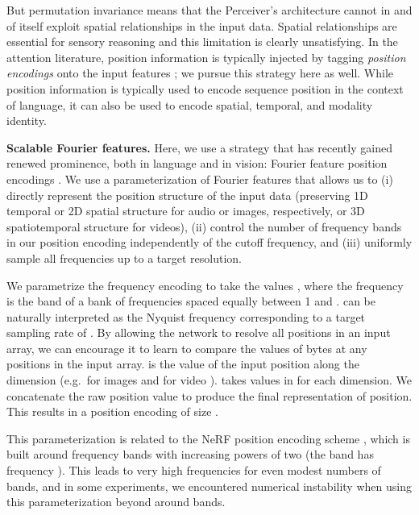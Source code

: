 \documentclass{article}
\begin{document}
But permutation invariance means that the Perceiver's architecture cannot in and of itself exploit spatial relationships in the input data. Spatial relationships are essential for sensory reasoning \cite{kant1781critique} and this limitation is clearly unsatisfying. In the attention literature, position information is typically injected by tagging \textit{position encodings} onto the input features \cite{vaswani2017attention}; we pursue this strategy here as well. While position information is typically used to encode sequence position in the context of language, it can also be used to encode spatial, temporal, and modality identity.

\noindent \textbf{Scalable Fourier features.} Here, we use a strategy that has recently gained renewed prominence, both in language and in vision: Fourier feature position encodings \cite{stanley2007compositional, vaswani2017attention, parmar2018image, tancik2020fourier, mildenhall2020nerf}. We use a parameterization of Fourier features that allows us to (i) directly represent the position structure of the input data (preserving 1D temporal or 2D spatial structure for audio or images, respectively, or 3D spatiotemporal structure for videos), (ii) control the number of frequency bands in our position encoding independently of the cutoff frequency, and (iii) uniformly sample all frequencies up to a target resolution. 

We parametrize the frequency encoding to take the values , where the frequency  is the  band of a bank of frequencies spaced equally between 1 and .  can be naturally interpreted as the Nyquist frequency \citep{nyquist1928certain} corresponding to a target sampling rate of . By allowing the network to resolve all positions in an input array, we can encourage it to learn to compare the values of bytes at any positions in the input array.  is the value of the input position along the  dimension (e.g.\ for images  and for video ).  takes values in  for each dimension. We concatenate the raw position value  to produce the final representation of position. This results in a position encoding of size .

This parameterization is related to the NeRF position encoding scheme \cite{mildenhall2020nerf}, which is built around frequency bands with increasing powers of two (the  band has frequency ). This leads to very high frequencies for even modest numbers of bands, and in some experiments, we encountered numerical instability when using this parameterization beyond around  bands. 
\end{document}
